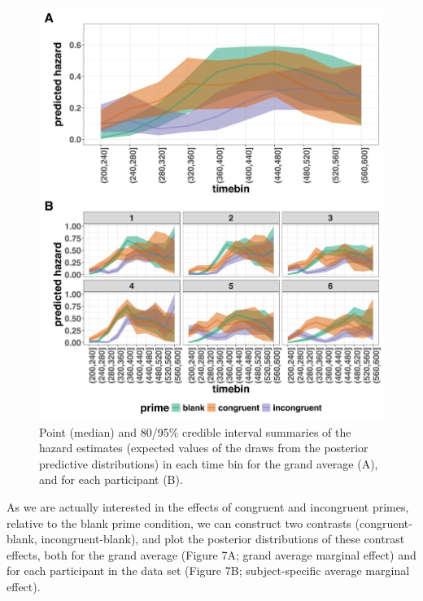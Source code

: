 \documentclass[
  man, donotrepeattitle,floatsintext]{apa6}
\begin{document}
\begin{figure}[H]

{\centering \includegraphics[width=0.8\linewidth,height=0.67\textheight,]{../Tutorial_2_Bayesian/figures/M1i_pred_combined} 

}

\caption{Point (median) and 80/95\% credible interval summaries of the hazard estimates (expected values of the draws from the posterior predictive distributions) in each time bin for the grand average (A), and for each participant (B).}\label{fig:plot-pred-grand-effects}
\end{figure}

As we are actually interested in the effects of congruent and incongruent primes, relative to the blank prime condition, we can construct two contrasts (congruent-blank, incongruent-blank), and plot the posterior distributions of these contrast effects, both for the grand average (Figure 7A; grand average marginal effect) and for each participant in the data set (Figure 7B; subject-specific average marginal effect).
\end{document}
